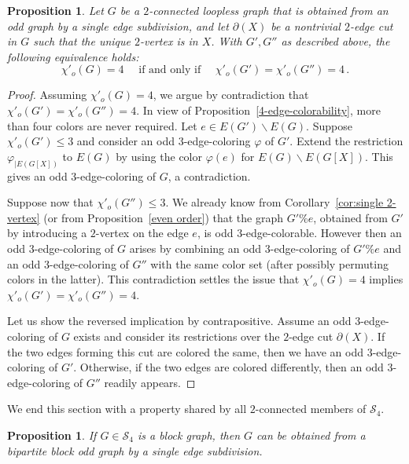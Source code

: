 \documentclass[a4paper,12pt]{article}
\newtheorem{proposition}[theorem]{Proposition}
\numberwithin{equation}{section}
\begin{document}
\begin{proposition}
    \label{glue}
Let $G$ be a $2$-connected loopless graph that is obtained from an odd graph by a single edge subdivision, and let $\partial(X)$ be a nontrivial $2$-edge cut in $G$ such that the unique $2$-vertex is in $X$. With $G',G''$ as described above, the following equivalence holds:
\begin{equation*}
\chi'_o(G)=4 \quad\text{ if and only if }\quad \chi'_o(G')=\chi'_o(G'')=4\,.
\end{equation*}
\end{proposition}
\begin{proof}
Assuming $\chi'_o(G)=4$, we argue by contradiction that $\chi'_o(G')=\chi'_o(G'')=4$. In view of Proposition~\ref{4-edge-colorability}, more than four colors are never required. Let $e\in E(G')\backslash E(G)$. Suppose $\chi'_o(G')\leq3$ and consider an odd $3$-edge-coloring $\varphi$ of $G'$. Extend the restriction $\varphi_{|E(G[X])}$ to $E(G)$ by using the color $\varphi(e)$ for $E(G)\backslash E(G[X])$. This gives an odd $3$-edge-coloring of $G$, a contradiction.

Suppose now that $\chi'_o(G'')\leq3$. We already know from Corollary~\ref{cor:single 2-vertex} (or from Proposition~\ref{even order}) that the graph $G'\%e$, obtained from $G'$ by introducing a $2$-vertex on the edge $e$, is odd $3$-edge-colorable. However then an odd $3$-edge-coloring of $G$ arises by combining an odd $3$-edge-coloring of $G'\%e$ and an odd $3$-edge-coloring of $G''$ with the same color set (after possibly permuting colors in the latter). This contradiction settles the issue that $\chi'_o(G)=4$ implies $\chi'_o(G')=\chi'_o(G'')=4$.

Let us show the reversed implication by contrapositive. Assume an odd $3$-edge-coloring of $G$ exists and consider its restrictions over the $2$-edge cut $\partial(X)$. If the two edges forming this cut are colored the same, then we have an odd $3$-edge-coloring of $G'$. Otherwise, if the two edges are colored differently, then an odd $3$-edge-coloring of $G''$ readily appears.
\end{proof}

We end this section with a property shared by all $2$-connected members of $\mathcal{S}_4$.

\begin{proposition}
    \label{lema:1}
If $G\in\mathcal{S}_4$ is a block graph, then $G$ can be obtained from a bipartite block odd graph by a single edge subdivision.
\end{proposition}
\end{document}
